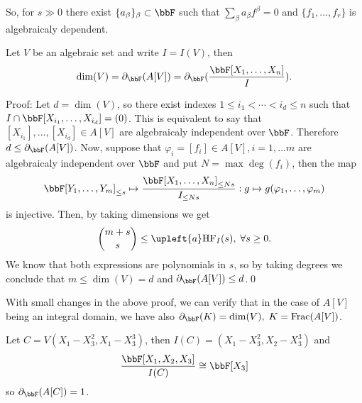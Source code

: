 \begin{itemize}
\begin{example}
    So, for $s\gg0$ there exist $\{a_\beta\}_\beta\subset\bbF$ such that 
    $\sum_{\beta}a_\beta f^\beta=0$ and $\{f_1,\dots, f_r\}$ is algebraicaly dependent.
    \end{example}
    \begin{theorem}
        Let $V$ be an algebraic set and write $I= I(V)$, then 
        \begin{equation}
            \dim(V) = \partial_{\bbF}(A[V])=\partial_{\bbF}(\frac{\bbF[X_1,\dots, X_n]}{I}).
        \end{equation}
    \end{theorem}
    Proof: Let $d=\dim(V)$, so there exist indexes $1\leq i_1<\cdots<i_d\leq n$ such that 
    $I\cap \bbF[X_{i_1},\dots,X_{i_d}]=(0)$. This is equivalent to say that 
    $[X_{i_1}],\dots, [X_{i_d}]\in A[V]$ are algebraicaly independent over $\bbF$. Therefore
    $d\leq \partial_{\bbF}(A[V])$. Now, suppose that $\varphi_i=[f_i]\in A[V],i=1,\dots m$ are 
    algebraicaly independent over $\bbF$ and put $N=\max{\deg(f_i)}$, then the map 
    \begin{equation}
        \bbF[Y_1,\dots, Y_m]_{\leq s}\mapsto \frac{\bbF[X_1,\dots,X_n]_{\leq Ns}}{I_{\leq Ns}}:g\mapsto g(\varphi_1,\dots,\varphi_m)
    \end{equation}
    is injective. Then, by taking dimensions we get
    \begin{equation}
     \binom{m+s}{s}  \leq \upleft{a}\text{HF}_{I}(s),\;\forall s\geq0. 
    \end{equation}
    We know that both expressions are polynomials in $s$, so by taking degrees we conclude that 
    $m\leq \dim(V) = d$ and $\partial_{\bbF}(A[V])\leq d$.\qed

    
    With small changes in the above proof, we can verify that in the case of $A[V]$ being an integral domain, we have 
    also $\partial_{\bbF}(K) = \dim(V),\;K=\text{Frac}(A[V])$.
\begin{example}
    Let $C=V(X_1-X_3^2,X_1-X_3^3)$, then $I(C)=(X_1-X_3^2,X_2-X_3^3)$ and 
    \begin{equation}
        \frac{\bbF[X_1,X_2,X_3]}{I(C)}\cong \bbF[X_3]
    \end{equation}
    so $\partial_{\bbF}(A[C])=1$.
\end{example}


\end{itemize}
